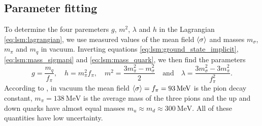 \subsection{Parameter fitting}
\label{sec:lsm:parameter_fit}

To determine the four paremeters $g$, $m^2$, $\lambda$ and $h$ in the Lagrangian \eqref{eq:lsm:lagrangian},
we use measured values of the mean field $\langle \sigma \rangle$ and masses $m_\sigma$, $m_\pi$ and $m_q$ in vacuum.
Inverting equations \eqref{eq:lsm:ground_state_implicit}, \eqref{eq:lsm:mass_sigmapi} and \eqref{eq:lsm:mass_quark}, we then find the parameters
\begin{equation}
	g       = \frac{m_q}{f_\pi}, \quad %
	h       = m_\pi^2 f_\pi, \quad %
	m^2     = \frac{3m_\pi^2 - m_\sigma^2}{2} \quad \text{and} \quad %
	\lambda = \frac{3 m_\sigma^2 - 3 m_\pi^2}{f_\pi^2} .    %
\label{eq:lsm:parameters}
\end{equation}
According to \cite{ref:pdg_review_2021}, in vacuum the mean field $\langle \sigma \rangle = f_\pi = \SI{93}{\mega\electronvolt}$ is the pion decay constant,
$m_\pi = \SI{138}{\mega\electronvolt}$ is the average mass of the three pions
and the up and down quarks have almost equal masses $m_u \approx m_d \approx \SI{300}{\mega\electronvolt}$.
All of these quantities have low uncertainty.

